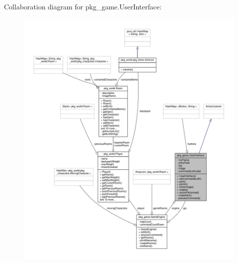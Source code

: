 Collaboration diagram for pkg\-\_\-game.\-User\-Interface\-:\nopagebreak
\begin{figure}[H]
\begin{center}
\leavevmode
\includegraphics[width=350pt]{classpkg__game_1_1UserInterface__coll__graph}
\end{center}
\end{figure}
